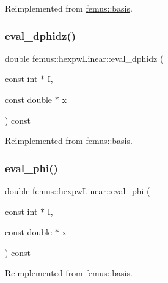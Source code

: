 Reimplemented from \mbox{\hyperlink{classfemus_1_1basis_a2819fac9aae797156b9efec8a0b85cc1}{femus\+::basis}}.

\mbox{\label{classfemus_1_1hexpw_linear_ac46b6a5791227243a89846dbcb967df2}} 
\subsubsection{\texorpdfstring{eval\+\_\+dphidz()}{eval\_dphidz()}}
{\footnotesize\ttfamily double femus\+::hexpw\+Linear\+::eval\+\_\+dphidz (\begin{DoxyParamCaption}\item[{const int $\ast$}]{I,  }\item[{const double $\ast$}]{x }\end{DoxyParamCaption}) const\hspace{0.3cm}{\ttfamily [virtual]}}



Reimplemented from \mbox{\hyperlink{classfemus_1_1basis_affd9927f6e25e264108219d862b8cb3d}{femus\+::basis}}.

\mbox{\label{classfemus_1_1hexpw_linear_a357f1070933e0eb6ccab44ee02a36ecf}} 
\subsubsection{\texorpdfstring{eval\+\_\+phi()}{eval\_phi()}}
{\footnotesize\ttfamily double femus\+::hexpw\+Linear\+::eval\+\_\+phi (\begin{DoxyParamCaption}\item[{const int $\ast$}]{I,  }\item[{const double $\ast$}]{x }\end{DoxyParamCaption}) const\hspace{0.3cm}{\ttfamily [virtual]}}



Reimplemented from \mbox{\hyperlink{classfemus_1_1basis_a89b0797cdccffae5ff6d059b32016ae5}{femus\+::basis}}.

\mbox{\label{classfemus_1_1hexpw_linear_a735e1f1b8e35cddcecfa075dadc460c4}} 

